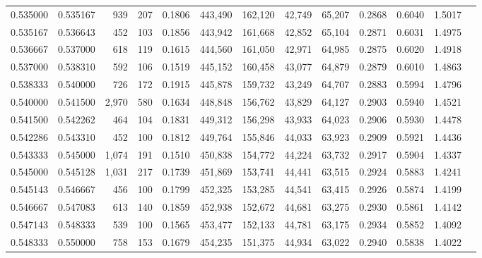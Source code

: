 \begin{tabular}{rrrrrrrrrrrrr}
0.535000 & 0.535167 &   939 & 207 &                                     0.1806 & 443,490 & 162,120 &  42,749 &  65,207 & 0.2868 & 0.6040 & 1.5017 \\
0.535167 & 0.536643 &   452 & 103 &                                     0.1856 & 443,942 & 161,668 &  42,852 &  65,104 & 0.2871 & 0.6031 & 1.4975 \\
0.536667 & 0.537000 &   618 & 119 &                                     0.1615 & 444,560 & 161,050 &  42,971 &  64,985 & 0.2875 & 0.6020 & 1.4918 \\
0.537000 & 0.538310 &   592 & 106 &                                     0.1519 & 445,152 & 160,458 &  43,077 &  64,879 & 0.2879 & 0.6010 & 1.4863 \\
0.538333 & 0.540000 &   726 & 172 &                                     0.1915 & 445,878 & 159,732 &  43,249 &  64,707 & 0.2883 & 0.5994 & 1.4796 \\
0.540000 & 0.541500 & 2,970 & 580 &                                     0.1634 & 448,848 & 156,762 &  43,829 &  64,127 & 0.2903 & 0.5940 & 1.4521 \\
0.541500 & 0.542262 &   464 & 104 &                                     0.1831 & 449,312 & 156,298 &  43,933 &  64,023 & 0.2906 & 0.5930 & 1.4478 \\
0.542286 & 0.543310 &   452 & 100 &                                     0.1812 & 449,764 & 155,846 &  44,033 &  63,923 & 0.2909 & 0.5921 & 1.4436 \\
0.543333 & 0.545000 & 1,074 & 191 &                                     0.1510 & 450,838 & 154,772 &  44,224 &  63,732 & 0.2917 & 0.5904 & 1.4337 \\
0.545000 & 0.545128 & 1,031 & 217 &                                     0.1739 & 451,869 & 153,741 &  44,441 &  63,515 & 0.2924 & 0.5883 & 1.4241 \\
0.545143 & 0.546667 &   456 & 100 &                                     0.1799 & 452,325 & 153,285 &  44,541 &  63,415 & 0.2926 & 0.5874 & 1.4199 \\
0.546667 & 0.547083 &   613 & 140 &                                     0.1859 & 452,938 & 152,672 &  44,681 &  63,275 & 0.2930 & 0.5861 & 1.4142 \\
0.547143 & 0.548333 &   539 & 100 &                                     0.1565 & 453,477 & 152,133 &  44,781 &  63,175 & 0.2934 & 0.5852 & 1.4092 \\
0.548333 & 0.550000 &   758 & 153 &                                     0.1679 & 454,235 & 151,375 &  44,934 &  63,022 & 0.2940 & 0.5838 & 1.4022 \\

\end{tabular}
